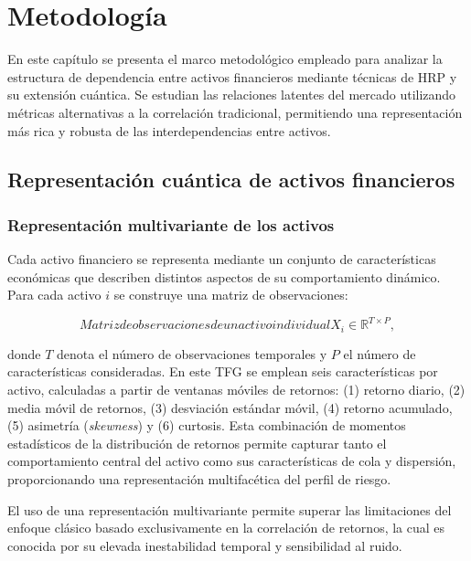 \chapter{Metodología}
\label{cap:metodologia}
En este capítulo se presenta el marco metodológico empleado para analizar la estructura de dependencia entre activos financieros mediante técnicas de \gls{HRP} y su extensión cuántica. Se estudian las relaciones latentes del mercado utilizando métricas alternativas a la correlación tradicional, permitiendo una representación más rica y robusta de las interdependencias entre activos.

\section{Representación cuántica de activos financieros}
\label{sec:representacion_cuantica_activos}

\subsection{Representación multivariante de los activos}
\label{subsec:representacion_multivariante}

Cada activo financiero se representa mediante un conjunto de características económicas que describen distintos aspectos de su comportamiento dinámico. Para cada activo $i$ se construye una matriz de observaciones:

\begin{equation}[eq:matriz_observaciones]{Matriz de observaciones de un activo individual}
X_i \in \mathbb{R}^{T \times P},
\end{equation}

donde $T$ denota el número de observaciones temporales y $P$ el número de características consideradas. En este TFG se emplean seis características por activo, calculadas a partir de ventanas móviles de retornos: (1) retorno diario, (2) media móvil de retornos, (3) desviación estándar móvil, (4) retorno acumulado, (5) asimetría (\textit{skewness}) y (6) curtosis. Esta combinación de momentos estadísticos de la distribución de retornos permite capturar tanto el comportamiento central del activo como sus características de cola y dispersión, proporcionando una representación multifacética del perfil de riesgo.

El uso de una representación multivariante permite superar las limitaciones del enfoque clásico basado exclusivamente en la correlación de retornos, la cual es conocida por su elevada inestabilidad temporal y sensibilidad al ruido.

